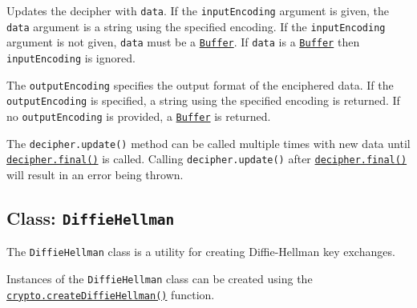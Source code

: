 Updates the decipher with \texttt{data}. If the \texttt{inputEncoding}
argument is given, the \texttt{data} argument is a string using the
specified encoding. If the \texttt{inputEncoding} argument is not given,
\texttt{data} must be a \href{buffer.md}{\texttt{Buffer}}. If
\texttt{data} is a \href{buffer.md}{\texttt{Buffer}} then
\texttt{inputEncoding} is ignored.

The \texttt{outputEncoding} specifies the output format of the
enciphered data. If the \texttt{outputEncoding} is specified, a string
using the specified encoding is returned. If no \texttt{outputEncoding}
is provided, a \href{buffer.md}{\texttt{Buffer}} is returned.

The \texttt{decipher.update()} method can be called multiple times with
new data until
\hyperref[decipherfinaloutputencoding]{\texttt{decipher.final()}} is
called. Calling \texttt{decipher.update()} after
\hyperref[decipherfinaloutputencoding]{\texttt{decipher.final()}} will
result in an error being thrown.

\subsection{\texorpdfstring{Class:
\texttt{DiffieHellman}}{Class: DiffieHellman}}\label{class-diffiehellman}

The \texttt{DiffieHellman} class is a utility for creating
Diffie-Hellman key exchanges.

Instances of the \texttt{DiffieHellman} class can be created using the
\hyperref[cryptocreatediffiehellmanprime-primeencoding-generator-generatorencoding]{\texttt{crypto.createDiffieHellman()}}
function.

